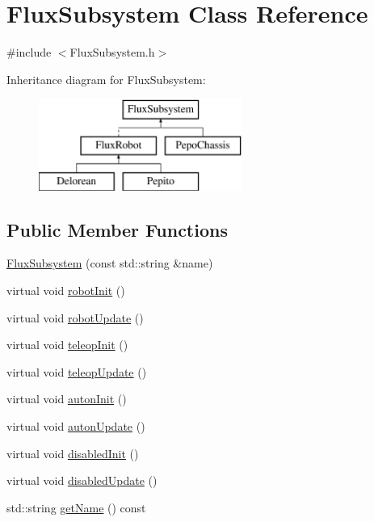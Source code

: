 \hypertarget{classFluxSubsystem}{}\section{Flux\+Subsystem Class Reference}
\label{classFluxSubsystem}


{\ttfamily \#include $<$Flux\+Subsystem.\+h$>$}

Inheritance diagram for Flux\+Subsystem\+:\begin{figure}[H]
\begin{center}
\leavevmode
\includegraphics[height=3.000000cm]{classFluxSubsystem}
\end{center}
\end{figure}
\subsection*{Public Member Functions}
\begin{DoxyCompactItemize}
\item 
\hyperlink{classFluxSubsystem_ae1c7aa86576c8b74db9283df11f556d0}{Flux\+Subsystem} (const std\+::string \&name)
\item 
virtual void \hyperlink{classFluxSubsystem_aacd5ddfcadda0866d5e838de09a60d63}{robot\+Init} ()
\item 
virtual void \hyperlink{classFluxSubsystem_ac2b1c08b53251870e945edf7080c1549}{robot\+Update} ()
\item 
virtual void \hyperlink{classFluxSubsystem_aec6d05e4f80c3783684598fb92ad2e55}{teleop\+Init} ()
\item 
virtual void \hyperlink{classFluxSubsystem_a327d76affc60699bfa62563e364e42f5}{teleop\+Update} ()
\item 
virtual void \hyperlink{classFluxSubsystem_a142cb34f612412e26bd0049e037dbe60}{auton\+Init} ()
\item 
virtual void \hyperlink{classFluxSubsystem_aceed900af22503022b8d1278f3693f77}{auton\+Update} ()
\item 
virtual void \hyperlink{classFluxSubsystem_aa0b8fde8aa5094627d15d24e545e1da4}{disabled\+Init} ()
\item 
virtual void \hyperlink{classFluxSubsystem_a5c39cb0f0834cc77a2b8f4f47778da87}{disabled\+Update} ()
\item 
std\+::string \hyperlink{classFluxSubsystem_a661009e388711cd134d519160d1633ac}{get\+Name} () const
\end{DoxyCompactItemize}


